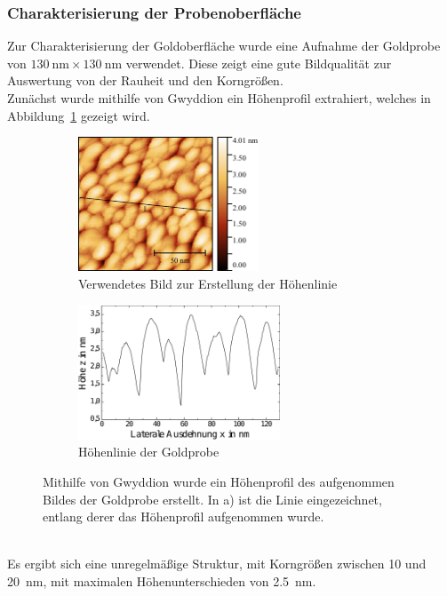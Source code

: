 \documentclass[a4paper,twoside,final]{article}
\begin{document}
\subsubsection{Charakterisierung der Probenoberfläche}
Zur Charakterisierung der Goldoberfläche wurde eine Aufnahme der Goldprobe von $\SI{130}{\nano\metre}\times\SI{130}{\nano\metre}$ verwendet. Diese zeigt eine gute Bildqualität zur Auswertung von der Rauheit und den Korngrößen.\\
Zunächst wurde mithilfe von Gwyddion ein Höhenprofil extrahiert, welches in Abbildung~\ref{fig:HoehenprofilGold} gezeigt wird.
\begin{figure}[htp]
    \centering
    \begin{subfigure}{0.45\textwidth}
        \includegraphics[height=4cm]{Bilder/Image01963_Bild_Hoehenprofil.pdf}
        \caption{Verwendetes Bild zur Erstellung der Höhenlinie}
    \end{subfigure}
    \hspace{0.5cm}
    \begin{subfigure}{0.45\textwidth}
        \includegraphics[height=4cm]{Bilder/Image01963_Hoehenprofil.pdf}
        \caption{Höhenlinie der Goldprobe\\}
    \end{subfigure}
    \caption{Mithilfe von Gwyddion wurde ein Höhenprofil des aufgenommen Bildes der Goldprobe erstellt. In a) ist die Linie eingezeichnet, entlang derer das Höhenprofil aufgenommen wurde.}
    \label{fig:HoehenprofilGold}
\end{figure}\\
Es ergibt sich eine unregelmäßige Struktur, mit Korngrößen zwischen 10 und \SI{20}{\nano\metre}, mit maximalen Höhenunterschieden von \SI{2.5}{\nano\metre}.\\
\end{document}
